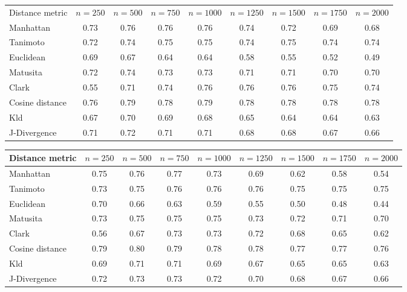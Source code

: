\begin{table*}
  \centering
  \caption{Average precisions for $n$-MF Tokens and Lemmas on St-Jean}
  \label{tab:tokens_lemmas}

  \label{tab:tokens}
  \begin{tabular}{l c c c c c c c c}
    \toprule
    Distance metric &
    $n=250$ &
    $n=500$ &
    $n=750$ &
    $n=1000$ &
    $n=1250$ &
    $n=1500$ &
    $n=1750$ &
    $n=2000$ \\
    Manhattan       & 0.73 & 0.76 & 0.76 & 0.76 & 0.74 & 0.72 & 0.69 & 0.68 \\
    Tanimoto        & 0.72 & 0.74 & 0.75 & 0.75 & 0.74 & 0.75 & 0.74 & 0.74 \\
    Euclidean       & 0.69 & 0.67 & 0.64 & 0.64 & 0.58 & 0.55 & 0.52 & 0.49 \\
    Matusita        & 0.72 & 0.74 & 0.73 & 0.73 & 0.71 & 0.71 & 0.70 & 0.70 \\
    Clark           & 0.55 & 0.71 & 0.74 & 0.76 & 0.76 & 0.76 & 0.75 & 0.74 \\
    Cosine distance & 0.76 & 0.79 & 0.78 & 0.79 & 0.78 & 0.78 & 0.78 & 0.78 \\
    Kld             & 0.67 & 0.70 & 0.69 & 0.68 & 0.65 & 0.64 & 0.64 & 0.63 \\
    J-Divergence    & 0.71 & 0.72 & 0.71 & 0.71 & 0.68 & 0.68 & 0.67 & 0.66 \\
    \bottomrule
  \end{tabular}

  \vspace{0.5cm}

  \label{tab:lemmas}
  \begin{tabular}{l c c c c c c c c}
    \toprule
    Distance metric &
    $n=250$ &
    $n=500$ &
    $n=750$ &
    $n=1000$ &
    $n=1250$ &
    $n=1500$ &
    $n=1750$ &
    $n=2000$ \\
    \midrule
    Manhattan       & 0.75 & 0.76 & 0.77 & 0.73 & 0.69 & 0.62 & 0.58 & 0.54 \\
    Tanimoto        & 0.73 & 0.75 & 0.76 & 0.76 & 0.76 & 0.75 & 0.75 & 0.75 \\
    Euclidean       & 0.70 & 0.66 & 0.63 & 0.59 & 0.55 & 0.50 & 0.48 & 0.44 \\
    Matusita        & 0.73 & 0.75 & 0.75 & 0.75 & 0.73 & 0.72 & 0.71 & 0.70 \\
    Clark           & 0.56 & 0.67 & 0.73 & 0.73 & 0.72 & 0.68 & 0.65 & 0.62 \\
    Cosine distance & 0.79 & 0.80 & 0.79 & 0.78 & 0.78 & 0.77 & 0.77 & 0.76 \\
    Kld             & 0.69 & 0.71 & 0.71 & 0.69 & 0.67 & 0.65 & 0.65 & 0.63 \\
    J-Divergence    & 0.72 & 0.73 & 0.73 & 0.72 & 0.70 & 0.68 & 0.67 & 0.66 \\
    \bottomrule
  \end{tabular}
\end{table*}

